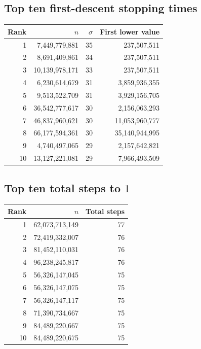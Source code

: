 \documentclass[11pt]{article}
\begin{document}
\subsection{Top ten first-descent stopping times}
\begin{center}\small
\begin{tabular}{rrrr}
\toprule
Rank & $n$ & $\sigma$ & First lower value\\\midrule
1&7,449,779,881&35&237,507,511\\
2&8,691,409,861&34&237,507,511\\
3&10,139,978,171&33&237,507,511\\
4&6,230,614,679&31&3,859,936,355\\
5&9,513,522,709&31&3,929,156,705\\
6&36,542,777,617&30&2,156,063,293\\
7&46,837,960,621&30&11,053,960,777\\
8&66,177,594,361&30&35,140,944,995\\
9&4,740,497,065&29&2,157,642,821\\
10&13,127,221,081&29&7,966,493,509\\
\bottomrule
\end{tabular}
\end{center}

\subsection{Top ten total steps to $1$}
\begin{center}\small
\begin{tabular}{rrr}
\toprule
Rank & $n$ & Total steps\\\midrule
1&62,073,713,149&77\\
2&72,419,332,007&76\\
3&81,452,110,031&76\\
4&96,238,245,817&76\\
5&56,326,147,045&75\\
6&56,326,147,075&75\\
7&56,326,147,117&75\\
8&71,390,734,667&75\\
9&84,489,220,667&75\\
10&84,489,220,675&75\\
\bottomrule
\end{tabular}
\end{center}
\end{document}
